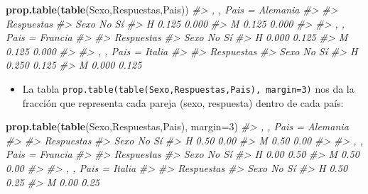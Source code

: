 \documentclass[
]{book}
\newenvironment{Shaded}{\begin{snugshade}}{\end{snugshade}}
\newcommand{\CommentTok}[1]{\textcolor[rgb]{0.56,0.35,0.01}{\textit{#1}}}
\newcommand{\DataTypeTok}[1]{\textcolor[rgb]{0.13,0.29,0.53}{#1}}
\newcommand{\DecValTok}[1]{\textcolor[rgb]{0.00,0.00,0.81}{#1}}
\newcommand{\KeywordTok}[1]{\textcolor[rgb]{0.13,0.29,0.53}{\textbf{#1}}}
\newcommand{\NormalTok}[1]{#1}
\providecommand{\tightlist}{%
  \setlength{\itemsep}{0pt}\setlength{\parskip}{0pt}}
\theoremstyle{definition}
\theoremstyle{definition}
\theoremstyle{definition}
\theoremstyle{remark}
\begin{document}
\begin{Shaded}
\begin{Highlighting}[]
\KeywordTok{prop.table}\NormalTok{(}\KeywordTok{table}\NormalTok{(Sexo,Respuestas,Pais)) }
\CommentTok{\#\textgreater{} , , Pais = Alemania}
\CommentTok{\#\textgreater{} }
\CommentTok{\#\textgreater{}     Respuestas}
\CommentTok{\#\textgreater{} Sexo    No    Sí}
\CommentTok{\#\textgreater{}    H 0.125 0.000}
\CommentTok{\#\textgreater{}    M 0.125 0.000}
\CommentTok{\#\textgreater{} }
\CommentTok{\#\textgreater{} , , Pais = Francia}
\CommentTok{\#\textgreater{} }
\CommentTok{\#\textgreater{}     Respuestas}
\CommentTok{\#\textgreater{} Sexo    No    Sí}
\CommentTok{\#\textgreater{}    H 0.000 0.125}
\CommentTok{\#\textgreater{}    M 0.125 0.000}
\CommentTok{\#\textgreater{} }
\CommentTok{\#\textgreater{} , , Pais = Italia}
\CommentTok{\#\textgreater{} }
\CommentTok{\#\textgreater{}     Respuestas}
\CommentTok{\#\textgreater{} Sexo    No    Sí}
\CommentTok{\#\textgreater{}    H 0.250 0.125}
\CommentTok{\#\textgreater{}    M 0.000 0.125}
\end{Highlighting}
\end{Shaded}

\begin{itemize}
\tightlist
\item
  La tabla \texttt{prop.table(table(Sexo,Respuestas,Pais),\ margin=3)} nos da la fracción que representa cada pareja (sexo, respuesta) dentro de cada país:
\end{itemize}

\begin{Shaded}
\begin{Highlighting}[]
\KeywordTok{prop.table}\NormalTok{(}\KeywordTok{table}\NormalTok{(Sexo,Respuestas,Pais), }\DataTypeTok{margin=}\DecValTok{3}\NormalTok{)}
\CommentTok{\#\textgreater{} , , Pais = Alemania}
\CommentTok{\#\textgreater{} }
\CommentTok{\#\textgreater{}     Respuestas}
\CommentTok{\#\textgreater{} Sexo   No   Sí}
\CommentTok{\#\textgreater{}    H 0.50 0.00}
\CommentTok{\#\textgreater{}    M 0.50 0.00}
\CommentTok{\#\textgreater{} }
\CommentTok{\#\textgreater{} , , Pais = Francia}
\CommentTok{\#\textgreater{} }
\CommentTok{\#\textgreater{}     Respuestas}
\CommentTok{\#\textgreater{} Sexo   No   Sí}
\CommentTok{\#\textgreater{}    H 0.00 0.50}
\CommentTok{\#\textgreater{}    M 0.50 0.00}
\CommentTok{\#\textgreater{} }
\CommentTok{\#\textgreater{} , , Pais = Italia}
\CommentTok{\#\textgreater{} }
\CommentTok{\#\textgreater{}     Respuestas}
\CommentTok{\#\textgreater{} Sexo   No   Sí}
\CommentTok{\#\textgreater{}    H 0.50 0.25}
\CommentTok{\#\textgreater{}    M 0.00 0.25}
\end{Highlighting}
\end{Shaded}
\end{document}
